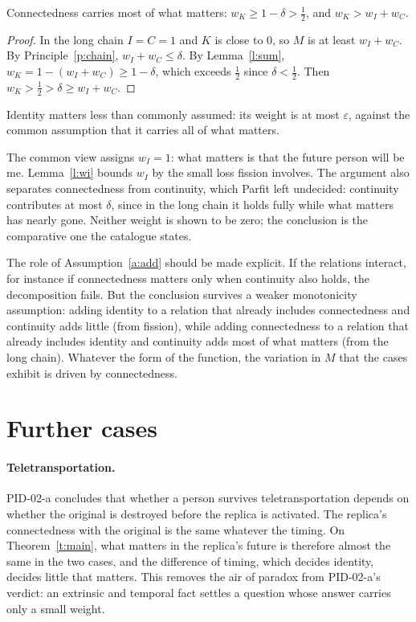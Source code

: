 \documentclass{situationist-preprint}
\begin{document}
\begin{theorem}\label{t:main}
Connectedness carries most of what matters: $w_K \geq 1-\delta > \tfrac12$, and $w_K > w_I + w_C$.
\end{theorem}

\begin{proof}
In the long chain $I=C=1$ and $K$ is close to $0$, so $M$ is at least $w_I + w_C$. By Principle~\ref{p:chain}, $w_I + w_C \leq \delta$. By Lemma~\ref{l:sum}, $w_K = 1 - (w_I + w_C) \geq 1-\delta$, which exceeds $\tfrac{1}{2}$ since $\delta < \tfrac12$. Then $w_K > \tfrac12 > \delta \geq w_I + w_C$.
\end{proof}

\begin{corollary}\label{c:less}
Identity matters less than commonly assumed: its weight is at most $\varepsilon$, against the common assumption that it carries all of what matters.
\end{corollary}

The common view assigns $w_I = 1$: what matters is that the future person will be me. Lemma~\ref{l:wi} bounds $w_I$ by the small loss fission involves. The argument also separates connectedness from continuity, which Parfit left undecided: continuity contributes at most $\delta$, since in the long chain it holds fully while what matters has nearly gone. Neither weight is shown to be zero; the conclusion is the comparative one the catalogue states.

The role of Assumption~\ref{a:add} should be made explicit. If the relations interact, for instance if connectedness matters only when continuity also holds, the decomposition fails. But the conclusion survives a weaker monotonicity assumption: adding identity to a relation that already includes connectedness and continuity adds little (from fission), while adding connectedness to a relation that already includes identity and continuity adds most of what matters (from the long chain). Whatever the form of the function, the variation in $M$ that the cases exhibit is driven by connectedness.

\section{Further cases}\label{s:cases}

\paragraph{Teletransportation.} PID-02-a concludes that whether a person survives teletransportation depends on whether the original is destroyed before the replica is activated. The replica's connectedness with the original is the same whatever the timing. On Theorem~\ref{t:main}, what matters in the replica's future is therefore almost the same in the two cases, and the difference of timing, which decides identity, decides little that matters. This removes the air of paradox from PID-02-a's verdict: an extrinsic and temporal fact settles a question whose answer carries only a small weight.
\end{document}
